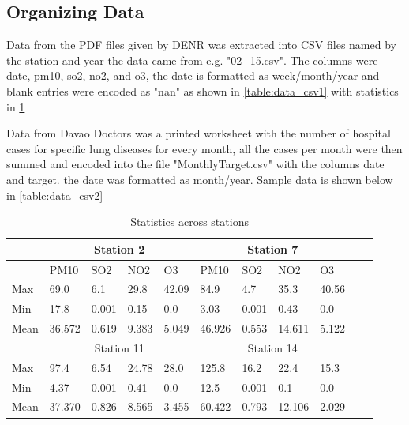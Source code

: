 ﻿\documentclass[10pt,11pt,12pt,oneside]{book}
\begin{document}
    \subsection{Organizing Data}
Data from the PDF files given by DENR was extracted into CSV files named by the station and year the data came from e.g. "02\_15.csv". The columns were date, pm10, so2, no2, and o3, the date is formatted as week/month/year and blank entries were encoded as "nan" as shown in \ref{table:data_csv1} with statistics in \ref{table:minMax}

Data from Davao Doctors was a printed worksheet with the number of hospital cases for specific lung diseases for every month, all the cases per month were then summed and encoded into the file "MonthlyTarget.csv" with the columns date and target. the date was formatted as month/year. Sample data is shown below in \ref{table:data_csv2}\\
\begin{table}[H]
    \centering
    \begin{tabular}{lllll|llllll}
\toprule 
      &\multicolumn{4}{c}{Station 2} & \multicolumn{4}{c}{Station 7} \\
    \midrule
     & PM10 & SO2 & NO2 & O3 & PM10 & SO2 & NO2 & O3 \\
    \midrule
    Max & 69.0 & 6.1 & 29.8 & 42.09 & 84.9 & 4.7 & 35.3 & 40.56 \\
    Min & 17.8 & 0.001 & 0.15 & 0.0 & 3.03 & 0.001 & 0.43 & 0.0  \\
    Mean & 36.572 & 0.619 & 9.383 & 5.049 & 46.926 & 0.553 & 14.611 & 5.122 \\
    \midrule
    & \multicolumn{4}{c}{Station 11} & \multicolumn{4}{c}{Station 14} \\
    \midrule
    Max & 97.4 & 6.54 & 24.78 & 28.0 & 125.8 & 16.2 & 22.4 & 15.3 \\
    Min & 4.37 & 0.001 & 0.41 & 0.0 & 12.5 & 0.001 & 0.1 & 0.0 \\
    Mean & 37.370 & 0.826 & 8.565 & 3.455 & 60.422 & 0.793 & 12.106 & 2.029 \\
    \bottomrule
\end{tabular}
    \caption{Statistics across stations}
    \label{table:minMax}
\end{table}
    
\end{document}

